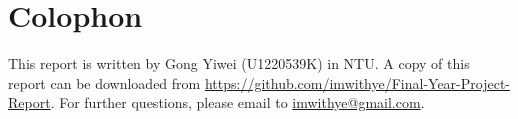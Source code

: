 \chapter*{Colophon}

\begin{center}
This report is written by Gong Yiwei (U1220539K) in NTU. A copy of this report can be downloaded from \url{https://github.com/imwithye/Final-Year-Project-Report}. For further questions, please email to \url{imwithye@gmail.com}.
\end{center}
